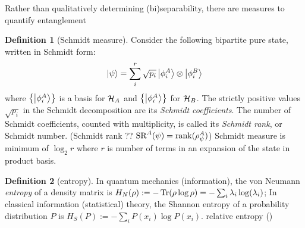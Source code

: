 \documentclass[
10pt,
aps,
pra,
linenumbers,
floatfix,
]{revtex4-2}
\theoremstyle{plain}
\theoremstyle{definition}
\newtheorem{definition}{Definition}
\newtheorem{remark}{Remark}
\newcommand{\dm}{\rho}
\begin{document}
Rather than qualitatively determining (bi)separability, there are measures to quantify entanglement
\begin{definition}[Schmidt measure]\label{def:schmidt_measure}
	Consider the following bipartite pure state, written in Schmidt form:
	\begin{equation}
		\ket{\psi} = \sum_i^r \sqrt{p_i} \ket{\phi_i^A}\otimes\ket{\phi_i^B}
		\label{eq:schmidt_decomposition}
	\end{equation}
	where $\qty{\ket{\phi_i^A}}$ is a basis for $\mathcal{H}_A$ and $\qty{\ket{\phi_i^A}}$ for $\mathcal{H}_B$.
	The strictly positive values $\sqrt{p_i}$ in the Schmidt decomposition are its \emph{Schmidt coefficients}. 
	The number of Schmidt coefficients, counted with multiplicity, is called its \emph{Schmidt rank}, or Schmidt number. (Schmidt rank ?? $\text{SR}^A(\psi)=\rank(\rho_{\psi}^A)$)
	Schmidt measure is minimum of $\log_2 r$ where $r$ is number of terms in an expansion of the state in product basis.
\end{definition}

\begin{definition}[entropy]\label{def:entropy}
	In quantum mechanics (information), the von Neumann \emph{entropy} of a density matrix is $H_N(\dm): = -\Tr(\dm \log \dm)=-\sum_i\lambda_i\log(\lambda_i)$;
	In classical information (statistical) theory, the Shannon entropy of a probability distribution $P$ is  $H_S(P):= -\sum_i P(x_i) \log P(x_i)$.
	relative entropy ()
\end{definition}
\end{document}
